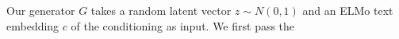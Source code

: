 Our generator $G$ takes a random latent vector $z \sim N(0, 1)$ and an ELMo text embedding $c$ of the conditioning as input. We first pass the 